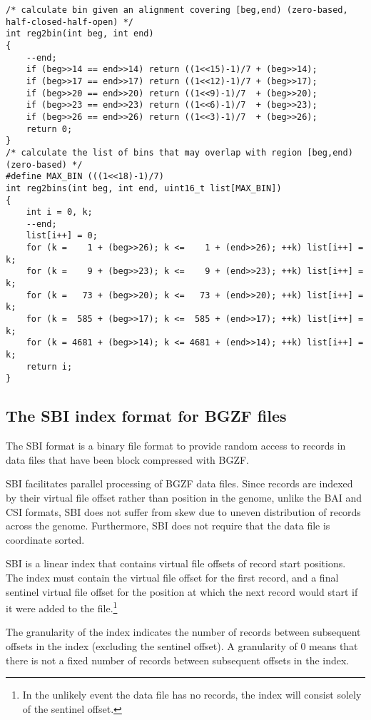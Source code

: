 \documentclass[10pt]{article}
\begin{document}
{\small
\begin{verbatim}
/* calculate bin given an alignment covering [beg,end) (zero-based, half-closed-half-open) */
int reg2bin(int beg, int end)
{
    --end;
    if (beg>>14 == end>>14) return ((1<<15)-1)/7 + (beg>>14);
    if (beg>>17 == end>>17) return ((1<<12)-1)/7 + (beg>>17);
    if (beg>>20 == end>>20) return ((1<<9)-1)/7  + (beg>>20);
    if (beg>>23 == end>>23) return ((1<<6)-1)/7  + (beg>>23);
    if (beg>>26 == end>>26) return ((1<<3)-1)/7  + (beg>>26);
    return 0;
}
/* calculate the list of bins that may overlap with region [beg,end) (zero-based) */
#define MAX_BIN (((1<<18)-1)/7)
int reg2bins(int beg, int end, uint16_t list[MAX_BIN])
{
    int i = 0, k;
    --end;
    list[i++] = 0;
    for (k =    1 + (beg>>26); k <=    1 + (end>>26); ++k) list[i++] = k;
    for (k =    9 + (beg>>23); k <=    9 + (end>>23); ++k) list[i++] = k;
    for (k =   73 + (beg>>20); k <=   73 + (end>>20); ++k) list[i++] = k;
    for (k =  585 + (beg>>17); k <=  585 + (end>>17); ++k) list[i++] = k;
    for (k = 4681 + (beg>>14); k <= 4681 + (end>>14); ++k) list[i++] = k;
    return i;
}
\end{verbatim}
}

\subsection{The SBI index format for BGZF files}\label{sec:code}
The SBI format is a binary file format to provide random access to records in
data files that have been block compressed with BGZF.

SBI facilitates parallel processing of BGZF data files. Since records are
indexed by their virtual file offset rather than position in the genome, unlike
the BAI and CSI formats, SBI does not suffer from skew due to uneven
distribution of records across the genome. Furthermore, SBI does not require
that the data file is coordinate sorted.

SBI is a linear index that contains virtual file offsets of record start
positions. The index must contain the virtual file offset for the first record,
and a final sentinel virtual file offset for the position at which the next
record would start if it were added to the file.\footnote{In the unlikely event
the data file has no records, the index will consist solely of the sentinel
offset.}

The granularity of the index indicates the number of records between
subsequent offsets in the index (excluding the sentinel offset). A granularity
of 0 means that there is not a fixed number of records between subsequent
offsets in the index.
\end{document}
